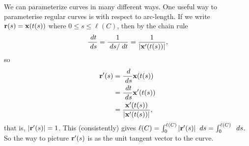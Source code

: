 \documentclass[a4paper]{scrartcl}
\begin{document}
We can parameterize curves in many different ways. One useful way to parameterise regular curves is with respect to arc-length.
If we write $\mathbf{r}(s) = \mathbf{x}(t(s))$ where $0 \leq s \leq \ell(C)$, then by the chain rule
$$
	\frac{\; d t}{\; d s} = \frac{1}{\; d s/ \; d t} = \frac{1}{|\mathbf{x}'(t(s))|},
$$
so
\begin{align*}
	\mathbf{r}'(s) &= \frac{\; d}{\; d s} \mathbf{x}(t(s)) \\
	&= \frac{\; d t}{\; d s} \mathbf{x}'(t(s)) \\
	&= \frac{\mathbf{x}'(t(s))}{|\mathbf{x}'(t(s))|},
\end{align*}
that is, $|\mathbf{r}'(s)| = 1$. This (consistently) gives $\ell(C) = \int_0^{\ell(C)} |\mathbf{r}'(s)| \; \; d s = \int_0^{\ell(C)} \; \; d s$.
So the way to picture $\mathbf{r}'(s)$ is as the unit tangent vector to the curve.
\end{document}
